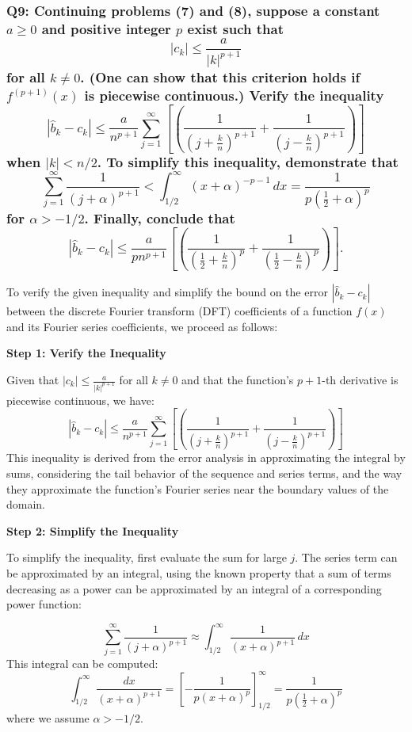 \documentclass[8pt]{article}
\begin{document}
{\subsubsection*{Q9:
Continuing problems (7) and (8), suppose a constant \(a \geq 0\) and positive integer \(p\) exist such that
\[
|c_k| \leq \frac{a}{|k|^{p+1}}
\]
for all \(k \neq 0\). (One can show that this criterion holds if \(f^{(p+1)}(x)\) is piecewise continuous.) Verify the inequality
\[
|\hat{b}_k - c_k| \leq \frac{a}{n^{p+1}} \sum_{j=1}^\infty \left[ \left( \frac{1}{\left( j + \frac{k}{n} \right)^{p+1}} + \frac{1}{\left( j - \frac{k}{n} \right)^{p+1}} \right) \right]
\]
when \(|k| < n/2\). To simplify this inequality, demonstrate that
\[
\sum_{j=1}^\infty \frac{1}{(j + \alpha)^{p+1}} < \int_{1/2}^\infty (x + \alpha)^{-p-1} \, dx = \frac{1}{p \left( \frac{1}{2} + \alpha \right)^p}
\]
for \(\alpha > -1/2\). Finally, conclude that
\[
|\hat{b}_k - c_k| \leq \frac{a}{pn^{p+1}} \left[ \left( \frac{1}{\left( \frac{1}{2} + \frac{k}{n} \right)^p} + \frac{1}{\left( \frac{1}{2} - \frac{k}{n} \right)^p} \right) \right].
\]}

To verify the given inequality and simplify the bound on the error \(|\hat{b}_k - c_k|\) between the discrete Fourier transform (DFT) coefficients of a function \(f(x)\) and its Fourier series coefficients, we proceed as follows:

\textbf{Step 1: Verify the Inequality}

Given that \(|c_k| \leq \frac{a}{|k|^{p+1}}\) for all \(k \neq 0\) and that the function's \(p+1\)-th derivative is piecewise continuous, we have:
\[ |\hat{b}_k - c_k| \leq \frac{a}{n^{p+1}} \sum_{j=1}^\infty \left[ \left( \frac{1}{\left( j + \frac{k}{n} \right)^{p+1}} + \frac{1}{\left( j - \frac{k}{n} \right)^{p+1}} \right) \right] \]
This inequality is derived from the error analysis in approximating the integral by sums, considering the tail behavior of the sequence and series terms, and the way they approximate the function's Fourier series near the boundary values of the domain.

\textbf{Step 2: Simplify the Inequality}

To simplify the inequality, first evaluate the sum for large \(j\). The series term can be approximated by an integral, using the known property that a sum of terms decreasing as a power can be approximated by an integral of a corresponding power function:

\[ \sum_{j=1}^\infty \frac{1}{(j + \alpha)^{p+1}} \approx \int_{1/2}^\infty \frac{1}{(x + \alpha)^{p+1}} \, dx \]
This integral can be computed:
\[ \int_{1/2}^\infty \frac{dx}{(x + \alpha)^{p+1}} = \left[ -\frac{1}{p(x + \alpha)^p} \right]_{1/2}^\infty = \frac{1}{p \left(\frac{1}{2} + \alpha\right)^p} \]
where we assume \( \alpha > -1/2 \).

}
\end{document}
